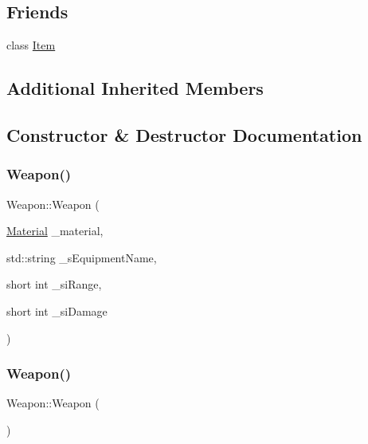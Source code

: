 \subsection*{Friends}
\begin{DoxyCompactItemize}
\item 
class \mbox{\hyperlink{class_weapon_aad85754f188b769ff61150eaf36106c4}{Item}}
\end{DoxyCompactItemize}
\subsection*{Additional Inherited Members}


\subsection{Constructor \& Destructor Documentation}
\mbox{\label{class_weapon_a832f6d4c8d48728aaf1fe0459bed0dbd}} 
\subsubsection{\texorpdfstring{Weapon()}{Weapon()}\hspace{0.1cm}{\footnotesize\ttfamily [1/3]}}
{\footnotesize\ttfamily Weapon\+::\+Weapon (\begin{DoxyParamCaption}\item[{\mbox{\hyperlink{class_material}{Material}}}]{\+\_\+material,  }\item[{std\+::string}]{\+\_\+s\+Equipment\+Name,  }\item[{short int}]{\+\_\+si\+Range,  }\item[{short int}]{\+\_\+si\+Damage }\end{DoxyParamCaption})}

\mbox{\label{class_weapon_a42dbc46dd70319a24763992c4ebbd396}} 
\subsubsection{\texorpdfstring{Weapon()}{Weapon()}\hspace{0.1cm}{\footnotesize\ttfamily [2/3]}}
{\footnotesize\ttfamily Weapon\+::\+Weapon (\begin{DoxyParamCaption}{ }\end{DoxyParamCaption})}

